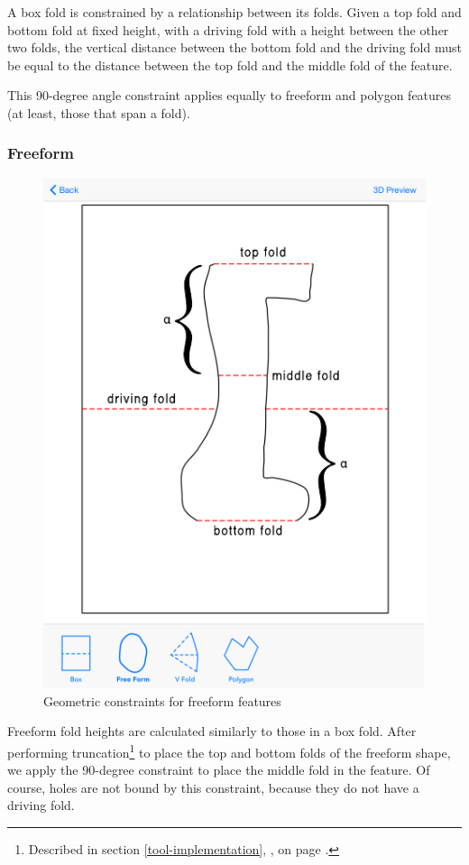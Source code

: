 A box fold is constrained by a relationship between its folds. Given a
top fold and bottom fold at fixed height, with a driving fold with a
height between the other two folds, the vertical distance between the
bottom fold and the driving fold must be equal to the distance between
the top fold and the middle fold of the feature.

This 90-degree angle constraint applies equally to freeform and polygon
features (at least, those that span a fold).

\subsubsection{Freeform}\label{freeform}

\begin{figure}[htbp]
\centering
\includegraphics{figures/45_Tech_Constraints/freeformConstraints.pdf}
\caption{Geometric constraints for freeform features}
\end{figure}

Freeform fold heights are calculated similarly to those in a box fold.
After performing truncation\footnote{Described in section
  \ref{tool-implementation}, , on page
  \pageref{tool-implementation}.} to place the top and bottom folds of
the freeform shape, we apply the 90-degree constraint to place the
middle fold in the feature. Of course, holes are not bound by this
constraint, because they do not have a driving fold.

